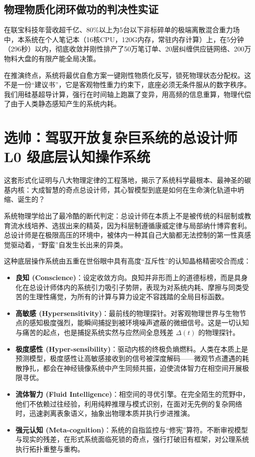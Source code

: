 \documentclass[11pt,a4paper]{article}
\begin{document}
\subsection{物理物质化闭环做功的判决性实证}
在联宝科技年营收超千亿、80\%以上为5台以下非标碎单的极端离散混合重力场中，本系统在个人笔记本（16核CPU，120G内存，常驻内存计算）上，在5分钟（296秒）以内，彻底收敛并刚性排产了50万笔订单、20层纠缠供应链网络、200万物料大盘的有限产能全局决策。

在推演终点，系统将最优自愈方案一键刚性物质化反写，锁死物理状态分配权。这不是一份“建议书”，它是客观物性重力约束下，底座必须无条件服从的数字秩序。我们用硅基超导计算，强行在时间轴上跑赢了变异，用高频的信息重算，物理代偿了由于人类静态感知产生的系统内耗。

\section{选帅：驾驭开放复杂巨系统的总设计师 L0 级底层认知操作系统}

这套形式化证明与八大物理定律的工程落地，揭示了系统科学最根本、最神圣的碳基内核：大成智慧的奇点总设计师，其心智模型到底是如何在生命演化轨道中坍缩、诞生的？

系统物理学给出了最冷酷的断代判定：总设计师在本质上不是被传统的科层制或教育流水线培养、选拔出来的精英，因为科层制遵循康威定律与局部纳什博弈套利。总设计师是在极限高压的环境中，被体内一种其自己大脑都无法控制的第一性真感觉驱动着，“野蛮”自发生长出来的异类。

这种底层操作系统由五重在世俗眼中具有高度“互斥性”的认知晶格精密咬合而成：
\begin{itemize}
    \item \textbf{良知 (Conscience)}：设定收敛方向。良知并非形而上的道德标榜，而是具身化在总设计师体内的系统引力吸引子势阱，表现为对系统内耗、摩擦与同类受苦的生理性痛觉，为所有的计算与算力设定不容践踏的全局目标函数。
    \item \textbf{高敏感 (Hypersensitivity)}：最前线的物理探针。对客观物理世界与生物节点的感知极度强烈，能瞬间捕捉到被环境噪声遮蔽的微细信号。这是一切认知与痛苦的起点，也是捕捉系统实然与应然间全息残差 $\Delta(t)$ 的物理探针。
    \item \textbf{极度感性 (Hyper-sensibility)}：驱动内核的终极负熵燃料。人类在本质上是预测模型，极度感性让高敏感接收到的信号被深度解码——微观节点遭遇的耗散挣扎，都会在神经镜像系统中产生同频共振，迫使流体智力在相空间开展极限寻优。
    \item \textbf{流体智力 (Fluid Intelligence)}：相空间的寻优引擎。在完全陌生的荒野中，他们不依赖过往经验，利用纯粹推理与模式识别，在面对无先例的复杂网络时，迅速剥离表象语义，抽象出物理本质并执行步进推演。
    \item \textbf{强元认知 (Meta-cognition)}：系统的自指监控与“修宪”算符。不断审视模型与现实的残差，在形式系统面临死锁的奇点，强行打破旧有框架，对公理系统执行拓扑重整与重构。
\end{itemize}
\end{document}

